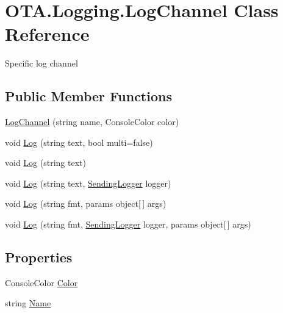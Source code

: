 \hypertarget{class_o_t_a_1_1_logging_1_1_log_channel}{}\section{O\+T\+A.\+Logging.\+Log\+Channel Class Reference}
\label{class_o_t_a_1_1_logging_1_1_log_channel}


Specific log channel  


\subsection*{Public Member Functions}
\begin{DoxyCompactItemize}
\item 
\hyperlink{class_o_t_a_1_1_logging_1_1_log_channel_a0d2bcc19f8f881bc79ec2c60d5c1e932}{Log\+Channel} (string name, Console\+Color color)
\item 
void \hyperlink{class_o_t_a_1_1_logging_1_1_log_channel_a301b49bad6dcbc9f867566fadaf439d4}{Log} (string text, bool multi=false)
\item 
void \hyperlink{class_o_t_a_1_1_logging_1_1_log_channel_ab0c4da3c2f8f17ac081bd08b6039ba4d}{Log} (string text)
\item 
void \hyperlink{class_o_t_a_1_1_logging_1_1_log_channel_af4d017c2d9a80297e05c67d48269128d}{Log} (string text, \hyperlink{namespace_o_t_a_1_1_logging_a8bc0baa35da015be032d07e537448cb2}{Sending\+Logger} logger)
\item 
void \hyperlink{class_o_t_a_1_1_logging_1_1_log_channel_a05ed9a0181d997cc93f418e37835f992}{Log} (string fmt, params object\mbox{[}$\,$\mbox{]} args)
\item 
void \hyperlink{class_o_t_a_1_1_logging_1_1_log_channel_a8816debb72a5cf77ed9d95b7a014de2e}{Log} (string fmt, \hyperlink{namespace_o_t_a_1_1_logging_a8bc0baa35da015be032d07e537448cb2}{Sending\+Logger} logger, params object\mbox{[}$\,$\mbox{]} args)
\end{DoxyCompactItemize}
\subsection*{Properties}
\begin{DoxyCompactItemize}
\item 
Console\+Color \hyperlink{class_o_t_a_1_1_logging_1_1_log_channel_a0c9d327b80da5f97f05a1231e3781dcf}{Color}
\item 
string \hyperlink{class_o_t_a_1_1_logging_1_1_log_channel_a2ac512f910ea122eb77d3d8af7e43f9d}{Name}
\end{DoxyCompactItemize}


